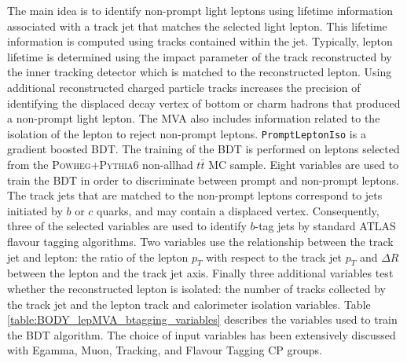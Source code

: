 The main idea is to identify non-prompt light leptons using lifetime information associated with a track jet that matches the selected light lepton. This lifetime information is computed using tracks contained within the jet. Typically, lepton lifetime is determined using the impact parameter of the track reconstructed by the inner tracking detector which is matched to the reconstructed lepton. Using additional reconstructed charged particle tracks increases the precision of identifying the displaced decay vertex of bottom or charm hadrons that produced a non-prompt light lepton. The MVA also includes information related to the isolation of the lepton to reject non-prompt leptons.
                                                                                                                              \texttt{PromptLeptonIso} is a gradient boosted BDT. The training of the BDT is performed on leptons selected from the \textsc{Powheg+Pythia6} non-allhad $t\bar{t}$ MC sample. Eight variables are used to train the BDT in order to discriminate between prompt and non-prompt leptons. The track jets that are matched to the non-prompt leptons correspond to jets initiated by $b$ or $c$ quarks, and may contain a displaced vertex. Consequently, three of the selected variables are used to identify $b$-tag jets by standard ATLAS flavour tagging algorithms. Two variables use the relationship between the track jet and lepton: the ratio of the lepton $p_{T}$ with respect to the track jet $p_{T}$ and $\Delta R$ between the lepton and the track jet axis.  Finally three additional variables test whether the reconstructed lepton is isolated: the number of tracks collected by the track jet and the lepton track and calorimeter isolation variables. Table \ref{table:BODY_lepMVA_btagging_variables} describes the variables used to train the BDT algorithm. The choice of input variables has been extensively discussed with Egamma, Muon, Tracking, and Flavour Tagging CP groups.

